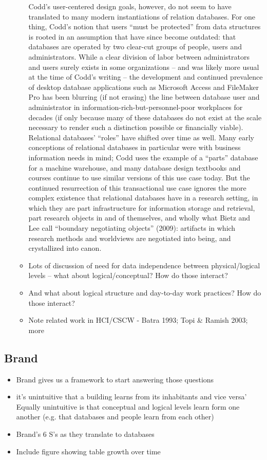 \begin{itemize}
\begin{itemize}
Codd’s user-centered design goals, however, do not seem to have translated to many modern instantiations of relation databases. For one thing, Codd’s notion that users “must be protected” from data structures is rooted in an assumption that have since become outdated: that databases are operated by two clear-cut groups of people, users and administrators.  While a clear division of labor between administrators and users surely exists in some organizations – and was likely more usual at the time of Codd’s writing – the development and continued prevalence of desktop database applications such as Microsoft Access and FileMaker Pro has been blurring (if not erasing) the line between database user and administrator in information-rich-but-personnel-poor workplaces for decades (if only because many of these databases do not exist at the scale necessary to render such a distinction possible or financially viable). 
Relational databases’ “roles” have shifted over time as well. Many early conceptions of relational databases in particular were with business information needs in mind; Codd uses the example of a “parts” database for a machine warehouse, and many database design textbooks and courses continue to use similar versions of this use case today.  But the continued resurrection of this transactional use case ignores the more complex existence that relational databases have in a research setting, in which they are part infrastructure for information storage and retrieval, part research objects in and of themselves, and wholly what Bietz and Lee call “boundary negotiating objects” (2009): artifacts in which research methods and worldviews are negotiated into being, and crystallized into canon.  

\item Lots of discussion of need for data independence between physical/logical levels – what about logical/conceptual? How do those interact?
\item And what about logical structure and day-to-day work practices? How do those interact?
\item Note related work in HCI/CSCW - Batra 1993; Topi & Ramish 2003; more
\end{itemize}
\end{itemize}

\subsection{Brand}

\begin{itemize}
\item Brand gives us a framework to start answering those questions
\item	it's unintuitive that a building learns from its inhabitants and vice versa’ Equally unintuitive is that conceptual and logical levels learn form one another (e.g. that databases and people learn from each other)
\item Brand’s 6 S’s as they translate to databases
\item Include figure showing table growth over time
\end{itemize}

